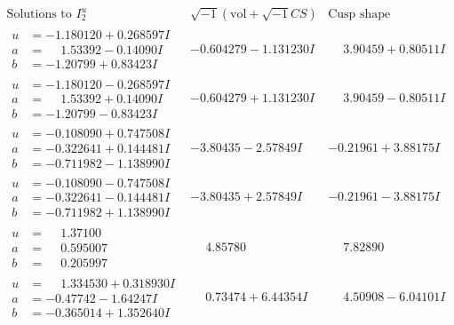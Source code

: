 \documentclass[1p]{elsarticle_modified}
\theoremstyle{definition}
\newcommand{\I}{\sqrt{-1}}
\begin{document}
$$\begin{array}{c|c|c}  
\text{Solutions to }I^u_{2}& \I (\text{vol} + \sqrt{-1}CS) & \text{Cusp shape}\\
 \hline 
\begin{aligned}
u &= -1.180120 + 0.268597 I \\
a &= \phantom{-}1.53392 - 0.14090 I \\
b &= -1.20799 + 0.83423 I\end{aligned}
 & -0.604279 - 1.131230 I & \phantom{-}3.90459 + 0.80511 I \\ \hline\begin{aligned}
u &= -1.180120 - 0.268597 I \\
a &= \phantom{-}1.53392 + 0.14090 I \\
b &= -1.20799 - 0.83423 I\end{aligned}
 & -0.604279 + 1.131230 I & \phantom{-}3.90459 - 0.80511 I \\ \hline\begin{aligned}
u &= -0.108090 + 0.747508 I \\
a &= -0.322641 + 0.144481 I \\
b &= -0.711982 - 1.138990 I\end{aligned}
 & -3.80435 - 2.57849 I & -0.21961 + 3.88175 I \\ \hline\begin{aligned}
u &= -0.108090 - 0.747508 I \\
a &= -0.322641 - 0.144481 I \\
b &= -0.711982 + 1.138990 I\end{aligned}
 & -3.80435 + 2.57849 I & -0.21961 - 3.88175 I \\ \hline\begin{aligned}
u &= \phantom{-}1.37100\phantom{ +0.000000I} \\
a &= \phantom{-}0.595007\phantom{ +0.000000I} \\
b &= \phantom{-}0.205997\phantom{ +0.000000I}\end{aligned}
 & \phantom{-}4.85780\phantom{ +0.000000I} & \phantom{-}7.82890\phantom{ +0.000000I} \\ \hline\begin{aligned}
u &= \phantom{-}1.334530 + 0.318930 I \\
a &= -0.47742 - 1.64247 I \\
b &= -0.365014 + 1.352640 I\end{aligned}
 & \phantom{-}0.73474 + 6.44354 I & \phantom{-}4.50908 - 6.04101 I \\ \hline\begin{aligned}

\end{aligned}
\end{array}$$
\end{document}
